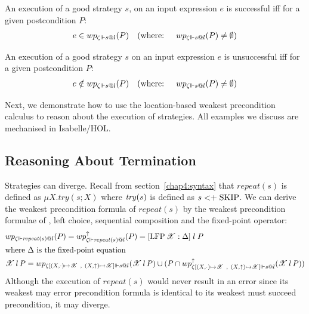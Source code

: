 \begin{definition} An execution of a good strategy $s$, on an input expression $e$ is successful iff for a given postcondition $P$:
\begin{align*}
&e \in wp_{\zeta \Vdash s@l}(P) &\textup{(where: $\quad wp_{\zeta \Vdash s@l}(P) \neq \emptyset$)}
\end{align*}
\label{chap4:reasoning:successful}
\end{definition}
\vspace{-2em}
\begin{definition} An execution of a good strategy $s$ on an input expression $e$ is unsuccessful iff for a given postcondition $P$:
\begin{align*}
&e \notin wp_{\zeta \Vdash s@l}(P) &\textup{(where: $\quad wp_{\zeta \Vdash s@l}(P) \neq \emptyset$)}
\end{align*}
\label{chap4:reasoning:unsuccessful}
\end{definition}
\vspace{-1.5em}
Next, we demonstrate how to use the location-based weakest precondition calculus to reason about the execution of strategies. All examples we discuss are mechanised in Isabelle/HOL.

\subsection{Reasoning About Termination}
\label{chap4:reasoning:termintation}
Strategies can diverge.
Recall from section~\ref{chap4:syntax} that $\mathit{repeat}(s)$ is defined as $\mu X. try(s; X)$ where $\text{\textit{try}}(s)$ is defined as $s <\mathrel{\mathop+} \text{SKIP}$. We can derive the weakest precondition formula of $\mathit{repeat}(s)$ by the weakest precondition formulae of \sskip, left choice, sequential composition and the fixed-point operator:
\begin{align*}
    &wp_{\zeta \Vdash \mathit{repeat}(s)@l}(P) = wp_{\zeta \Vdash \mathit{repeat}(s)@l}^\uparrow(P) = [\text{LFP}\, \mathscr{X}: \Delta]\;l\;P\\
    &\text{where $\Delta$ is the fixed-point equation}\\
    &\mathscr{X}\,l\,P = wp_{\zeta[(X, \cdot) \mapsto \mathscr{X} \ , \  (X, \uparrow) \mapsto \mathscr{X}] \Vdash s@l} (\mathscr{X}\,l\,P) \cup (P \cap wp_{\zeta[(X, \cdot) \mapsto \mathscr{X} \ , \  (X, \uparrow) \mapsto \mathscr{X}]\Vdash s@l}^\uparrow (\mathscr{X}\,l\,P))
\end{align*}
Although the execution of $\mathit{repeat}(s)$ would never result in an error since its weakest may error precondition formula is identical to its weakest must succeed precondition, it may diverge.

